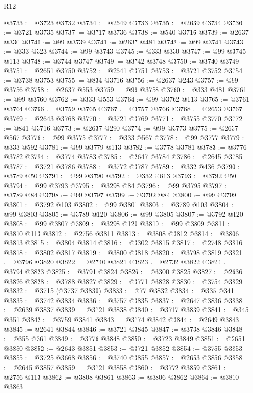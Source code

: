 \begin{lexlean}{R12}
\begin{coremodule}
@3733 := @3723 @3732
@3734 := @2649 @3733
@3735 := @2639 @3734
@3736 := @3721 @3735
@3737 := @3717 @3736
@3738 := @540 @3716
@3739 := @2637 @330
@3740 := @99 @3739
@3741 := @2637 @481
@3742 := @99 @3741
@3743 := @333 @323
@3744 := @99 @3743
@3745 := @333 @330
@3747 := @99 @3745 @113
@3748 := @3744 @3747
@3749 := @3742 @3748
@3750 := @3740 @3749
@3751 := @2651 @3750
@3752 := @2641 @3751
@3753 := @3721 @3752
@3754 := @3738 @3753
@3755 := @834 @3716
@3756 := @2637 @243
@3757 := @99 @3756
@3758 := @2637 @553
@3759 := @99 @3758
@3760 := @333 @481
@3761 := @99 @3760
@3762 := @333 @553
@3764 := @99 @3762 @113
@3765 := @3761 @3764
@3766 := @3759 @3765
@3767 := @3757 @3766
@3768 := @2653 @3767
@3769 := @2643 @3768
@3770 := @3721 @3769
@3771 := @3755 @3770
@3772 := @841 @3716
@3773 := @2637 @290
@3774 := @99 @3773
@3775 := @2637 @567
@3776 := @99 @3775
@3777 := @333 @567
@3778 := @99 @3777
@3779 := @333 @592
@3781 := @99 @3779 @113
@3782 := @3778 @3781
@3783 := @3776 @3782
@3784 := @3774 @3783
@3785 := @2647 @3784
@3786 := @2645 @3785
@3787 := @3721 @3786
@3788 := @3772 @3787
@3789 := @332 @436
@3790 := @3789 @50
@3791 := @99 @3790
@3792 := @332 @613
@3793 := @3792 @50
@3794 := @99 @3793
@3795 := @3298 @84
@3796 := @99 @3795
@3797 := @3789 @84
@3798 := @99 @3797
@3799 := @3792 @84
@3800 := @99 @3799
@3801 := @3792 @103
@3802 := @99 @3801
@3803 := @3789 @103
@3804 := @99 @3803
@3805 := @3789 @120
@3806 := @99 @3805
@3807 := @3792 @120
@3808 := @99 @3807
@3809 := @3298 @120
@3810 := @99 @3809
@3811 := @3810 @113
@3812 := @2756 @3811
@3813 := @3808 @3812
@3814 := @3806 @3813
@3815 := @3804 @3814
@3816 := @3302 @3815
@3817 := @2748 @3816
@3818 := @3802 @3817
@3819 := @3800 @3818
@3820 := @3798 @3819
@3821 := @3796 @3820
@3822 := @2740 @3821
@3823 := @2732 @3822
@3824 := @3794 @3823
@3825 := @3791 @3824
@3826 := @3300 @3825
@3827 := @2636 @3826
@3828 := @3788 @3827
@3829 := @3771 @3828
@3830 := @3754 @3829
@3832 := @3715 (@3737 @3830)
@3833 := @77 @3832
@3834 := @335 @341
@3835 := @3742 @3834
@3836 := @3757 @3835
@3837 := @2647 @3836
@3838 := @2639 @3837
@3839 := @3721 @3838
@3840 := @3717 @3839
@3841 := @345 @351
@3842 := @3759 @3841
@3843 := @3774 @3842
@3844 := @2649 @3843
@3845 := @2641 @3844
@3846 := @3721 @3845
@3847 := @3738 @3846
@3848 := @355 @361
@3849 := @3776 @3848
@3850 := @3723 @3849
@3851 := @2651 @3850
@3852 := @2643 @3851
@3853 := @3721 @3852
@3854 := @3755 @3853
@3855 := @3725 @3668
@3856 := @3740 @3855
@3857 := @2653 @3856
@3858 := @2645 @3857
@3859 := @3721 @3858
@3860 := @3772 @3859
@3861 := @2756 @113
@3862 := @3808 @3861
@3863 := @3806 @3862
@3864 := @3810 @3863

\end{coremodule}
\end{lexlean}
